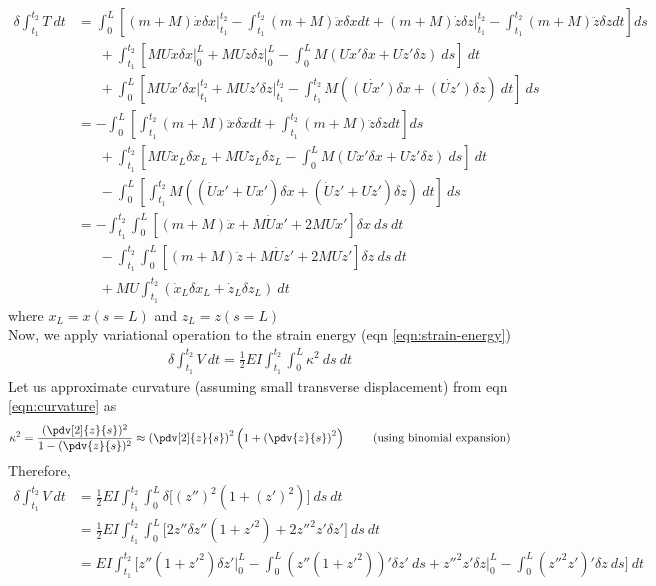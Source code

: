 \begin{align*}
\delta \int_{t_1}^{t_2} T~dt & = \int_0^L \left[(m + M)\dot{x}\delta x\bigg|_{t_1}^{t_2} - \int_{t_1}^{t_2}  (m + M) \ddot{x}\delta x dt + (m + M)\dot{z}\delta z\bigg|_{t_1}^{t_2} - \int_{t_1}^{t_2}  (m + M) \ddot{z}\delta z dt \right]ds \\
   &\phantom{=}~ + \int_{t_1}^{t_2} \left[MU\dot{x}\delta x\bigg|_0^L + MU\dot{z}\delta z\bigg|_0^L - \int_0^L M (U\dot{x}'\delta x + U\dot{z}'\delta z)~ds\right]~dt \\
    &\phantom{=}~ + \int_0^L \left[MUx'\delta x\bigg|_{t_1}^{t_2} + MUz'\delta z\bigg|_{t_1}^{t_2} - \int_{t_1}^{t_2} M(\dot{(Ux')}\delta x  + \dot{(Uz')}\delta z)~dt\right]~ds \\
    & = - \int_0^L \left[\int_{t_1}^{t_2}  (m + M) \ddot{x}\delta x dt + \int_{t_1}^{t_2}  (m + M) \ddot{z}\delta z dt \right]ds \\
    &\phantom{=}~ + \int_{t_1}^{t_2} \left[MU\dot{x}_L\delta x_L + MU\dot{z}_L\delta z_L - \int_0^L M (U\dot{x}'\delta x + U\dot{z}'\delta z)~ds\right]~dt \\
    &\phantom{=}~ - \int_0^L \left[\int_{t_1}^{t_2} M((\dot{U}x' + U\dot{x}')\delta x  + (\dot{U}z' + U\dot{z}')\delta z)~dt\right]~ds \\
    & = - \int_{t_1}^{t_2}\int_0^L \left[  (m + M) \ddot{x} + M\dot{U}x' + 2M U\dot{x}'\right]\delta x~ds~dt \\
    &\phantom{=}~ - \int_{t_1}^{t_2}\int_0^L \left[  (m + M) \ddot{z} + M\dot{U}z' + 2M U\dot{z}'\right]\delta z~ds~dt\\
    &\phantom{=}~ + MU \int_{t_1}^{t_2} (\dot{x}_L\delta x_L + \dot{z}_L\delta z_L)~dt
\end{align*}
where $x_L = x (s = L)$ and $z_L = z (s = L)$ \\
Now, we apply variational operation to the strain energy (eqn \ref{eqn:strain-energy})
\begin{align*}
\delta \int_{t_1}^{t_2} V~dt  = \frac{1}{2}  EI \int_{t_1}^{t_2} \int_0^L\kappa^2~ ds~dt 
\end{align*}
Let us approximate curvature (assuming small transverse displacement)  from eqn \ref{eqn:curvature} as
\begin{align*}
  \kappa^2 = \frac{(\pdv[2]{z}{s})^2}{1 - (\pdv{z}{s})^2} \approx \left(\pdv[2]{z}{s}\right)^2\left(1 + \left(\pdv{z}{s}\right)^2\right) ~\qquad (\text{using binomial expansion})
\end{align*}
Therefore,
\begin{align*}
\delta \int_{t_1}^{t_2} V~dt  &= \frac{1}{2}  EI \int_{t_1}^{t_2} \int_0^L \delta\bigg[\left(z''\right)^2\left(1 + \left(z'\right)^2\right)\bigg]~ ds~dt  \\
  &= \frac{1}{2}  EI \int_{t_1}^{t_2} \int_0^L\bigg[2z''\delta z''(1 + {z'}^2) + 2{z''}^2z'\delta z'\bigg]~ds~dt \\
  &= EI \int_{t_1}^{t_2} \bigg[z''(1 + z'^2)\delta z'\bigg|_0^L - \int_0^L (z''(1 + z'^2))'\delta z'~ds + z''^2z'\delta z\bigg|_0^L - \int_0^L (z''^2z')'\delta z~ds\bigg]~dt 
\end{align*}
